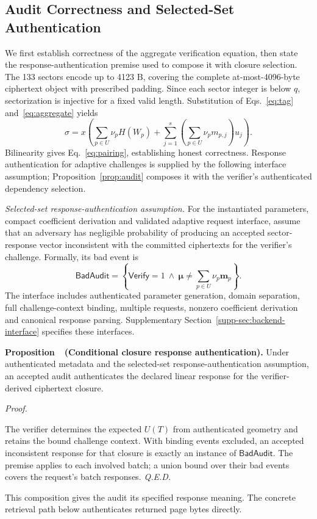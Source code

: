 \documentclass[10pt,journal]{IEEEtran}
\newcounter{proposition}
\newenvironment{proposition}[1]{%
  \refstepcounter{proposition}\par\smallskip\noindent
  \textbf{Proposition~\theproposition\ (#1). }\ignorespaces
}{\par\smallskip}
\newenvironment{claimproof}{\par\noindent\emph{Proof. }\ignorespaces
}{\hfill\textit{Q.E.D.}\par\smallskip}
\begin{document}
\subsection{Audit Correctness and Selected-Set Authentication}\label{sec:audit-scope}
We first establish correctness of the aggregate verification equation, then
state the response-authentication premise used to compose it with closure
selection. The 133 sectors encode up to 4123 B, covering the complete at-most-4096-byte
ciphertext object with prescribed padding. Since each sector integer is
below $q$, sectorization is injective for a fixed valid length. Substitution
of Eqs.~\eqref{eq:tag} and~\eqref{eq:aggregate} yields
\begin{equation}\label{eq:honest}
\sigma=x\left(\sum_{p\in U}\nu_pH(W_p)+
\sum_{j=1}^{s}\left(\sum_{p\in U}\nu_pm_{p,j}\right)u_j\right).
\end{equation}
Bilinearity gives Eq.~\eqref{eq:pairing}, establishing honest correctness.
Response authentication for adaptive challenges is supplied by the following
interface assumption; Proposition~\ref{prop:audit} composes it with the
verifier's authenticated dependency selection.

\emph{Selected-set response-authentication assumption.}
For the instantiated parameters, compact coefficient derivation and validated
adaptive request interface, assume that an adversary has negligible
probability of producing an accepted sector-response vector inconsistent
with the committed ciphertexts for the verifier's challenge. Formally, its
bad event is
\begin{equation}\label{eq:bad-audit}
\mathsf{BadAudit}=\left\{\mathsf{Verify}=1\ \land\
\boldsymbol\mu\neq\sum_{p\in U}\nu_p\mathbf m_p\right\}.
\end{equation}
The interface includes authenticated parameter generation, domain separation,
full challenge-context binding, multiple requests, nonzero coefficient
derivation and canonical response parsing. Supplementary
Section~\ref*{supp-sec:backend-interface} specifies these interfaces.

\begin{proposition}{Conditional closure response authentication}\label{prop:audit}
Under authenticated metadata and the selected-set response-authentication assumption,
an accepted audit authenticates the declared linear response for the
verifier-derived ciphertext closure.
\end{proposition}
\begin{claimproof}
The verifier determines the expected $U(T)$ from authenticated geometry
and retains the bound challenge context. With binding events excluded,
an accepted inconsistent response for that closure is exactly an instance
of $\mathsf{BadAudit}$. The premise applies to each involved batch; a union bound over their bad
events covers the request's batch responses.
\end{claimproof}
This composition gives the audit its specified response meaning. The concrete
retrieval path below authenticates returned page bytes directly.
\end{document}
